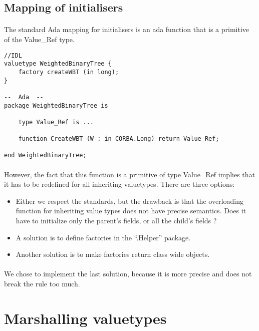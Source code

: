 \subsection{Mapping of initialisers}
\paragraph{}The standard Ada mapping for initialisers is an ada function that is a
primitive of the Value\_Ref type.

\begin{verbatim}
//IDL
valuetype WeightedBinaryTree {
	factory createWBT (in long);
}

--  Ada  --
package WeightedBinaryTree is

	type Value_Ref is ...

	function CreateWBT (W : in CORBA.Long) return Value_Ref;

end WeightedBinaryTree;
\end{verbatim}

\paragraph{}However, the fact that this function is a primitive of type
Value\_Ref implies that it has to be redefined for all inheriting
valuetypes. There are three options:

\begin{itemize}
\item Either we respect the standards, but the drawback is that the
overloading function for inheriting value types does not have precise
semantics. Does it have to initialize only the parent's fields, or all
the child's fields ?
\item A solution is to define factories in the ``.Helper'' package.
\item Another solution is to make factories return class wide objects.
\end{itemize}

\paragraph{}We chose to implement the last solution, because it is
more precise and does not break the rule too much.


\section{Marshalling valuetypes}

